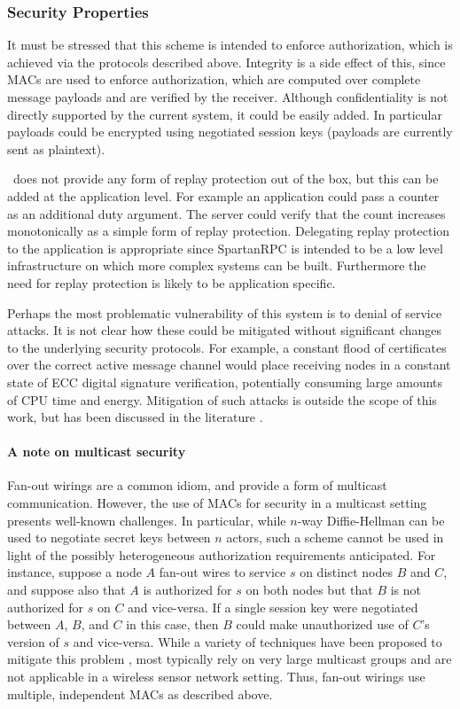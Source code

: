 \subsubsection{Security Properties}
\label{section-security-properties}

It must be stressed that this scheme is intended to enforce authorization, which is achieved via the
protocols described above. Integrity is a side effect of this, since MACs are used to enforce
authorization, which are computed over complete message payloads and are verified by the
receiver. Although confidentiality is not directly supported by the current system, it could be
easily added. In particular payloads could be encrypted using negotiated session keys (payloads
are currently sent as plaintext).

\Sprocket\ does not provide any form of replay protection out of the box, but this can be added
at the application level. For example an application could pass a counter as an additional duty
argument. The server could verify that the count increases monotonically as a simple form of
replay protection. Delegating replay protection to the application is appropriate since
SpartanRPC is intended to be a low level infrastructure on which more complex systems can be
built. Furthermore the need for replay protection is likely to be application specific.

Perhaps the most problematic vulnerability of this system is to denial of service attacks. It is
not clear how these could be mitigated without significant changes to the underlying security
protocols. For example, a constant flood of certificates over the correct active message channel
would place receiving nodes in a constant state of ECC digital signature verification,
potentially consuming large amounts of CPU time and energy. Mitigation of such attacks is
outside the scope of this work, but has been discussed in the literature \cite{4431860}.

\paragraph{A note on multicast security} Fan-out wirings are a common idiom, and provide a form
of multicast communication. However, the use of MACs for security in a multicast setting
presents well-known challenges. In particular, while $n$-way Diffie-Hellman can be used to
negotiate secret keys between $n$ actors, such a scheme cannot be used in light of the possibly
heterogeneous authorization requirements anticipated. For instance, suppose a node $A$ fan-out
wires to service $s$ on distinct nodes $B$ and $C$, and suppose also that $A$ is authorized for
$s$ on both nodes but that $B$ is not authorized for $s$ on $C$ and vice-versa. If a single
session key were negotiated between $A$, $B$, and $C$ in this case, then $B$ could make
unauthorized use of $C$'s version of $s$ and vice-versa. While a variety of techniques have been
proposed to mitigate this problem \cite{canetti-1999}, most typically rely on very large
multicast groups and are not applicable in a wireless sensor network setting. Thus, fan-out wirings use
multiple, independent MACs as described above.

